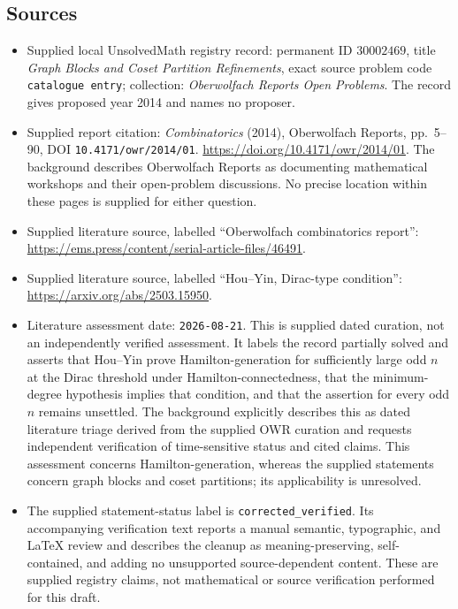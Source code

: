 \documentclass[11pt]{article}
\begin{document}
\subsection{Sources}
\begin{itemize}
\item Supplied local UnsolvedMath registry record: permanent ID \(30002469\), title \emph{Graph Blocks and Coset Partition Refinements}, exact source problem code \texttt{catalogue entry}; collection: \emph{Oberwolfach Reports Open Problems}. The record gives proposed year 2014 and names no proposer.
\item Supplied report citation: \emph{Combinatorics} (2014), Oberwolfach Reports, pp.~5--90, DOI \texttt{10.4171/owr/2014/01}. \url{https://doi.org/10.4171/owr/2014/01}. The background describes Oberwolfach Reports as documenting mathematical workshops and their open-problem discussions. No precise location within these pages is supplied for either question.
\item Supplied literature source, labelled ``Oberwolfach combinatorics report'': \url{https://ems.press/content/serial-article-files/46491}.
\item Supplied literature source, labelled ``Hou--Yin, Dirac-type condition'': \url{https://arxiv.org/abs/2503.15950}.
\item Literature assessment date: \texttt{2026-08-21}. This is supplied dated curation, not an independently verified assessment. It labels the record partially solved and asserts that Hou--Yin prove Hamilton-generation for sufficiently large odd \(n\) at the Dirac threshold under Hamilton-connectedness, that the minimum-degree hypothesis implies that condition, and that the assertion for every odd \(n\) remains unsettled. The background explicitly describes this as dated literature triage derived from the supplied OWR curation and requests independent verification of time-sensitive status and cited claims. This assessment concerns Hamilton-generation, whereas the supplied statements concern graph blocks and coset partitions; its applicability is unresolved.
\item The supplied statement-status label is \texttt{corrected\_verified}. Its accompanying verification text reports a manual semantic, typographic, and LaTeX review and describes the cleanup as meaning-preserving, self-contained, and adding no unsupported source-dependent content. These are supplied registry claims, not mathematical or source verification performed for this draft.
\end{itemize}
\end{document}
